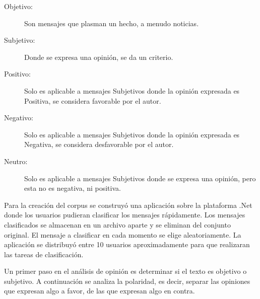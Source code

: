  \begin{description}
  \item[Objetivo:] Son mensajes que plasman un hecho, a menudo noticias.
  \item[Subjetivo:] Donde se expresa una opinión, se da un criterio.
  \item[Positivo:] Solo es aplicable a mensajes Subjetivos donde la opinión expresada es
  Positiva, se considera favorable por el autor.
  \item[Negativo:] Solo es aplicable a mensajes Subjetivos donde la opinión expresada es
  Negativa, se considera desfavorable por el autor.
  \item[Neutro:] Solo es aplicable a mensajes Subjetivos donde se expresa una opinión,
  pero esta no es negativa, ni positiva.
 \end{description}
 
%  

Para la creación del corpus se construyó una aplicación sobre la plataforma .Net donde 
los usuarios pudieran clasificar los
mensajes rápidamente. Los mensajes clasificados se almacenan en un archivo aparte y 
se eliminan del conjunto original. 
El mensaje a clasificar en cada momento se elige aleatoriamente. 
La aplicación se distribuyó entre 10 usuarios aproximadamente para que realizaran las tareas
de clasificación. 

Un primer paso en el análisis de opinión es determinar si el texto es objetivo o subjetivo.
A continuación se analiza la polaridad, es decir, separar las opiniones que expresan algo 
a favor, de las que expresan algo en contra. 

